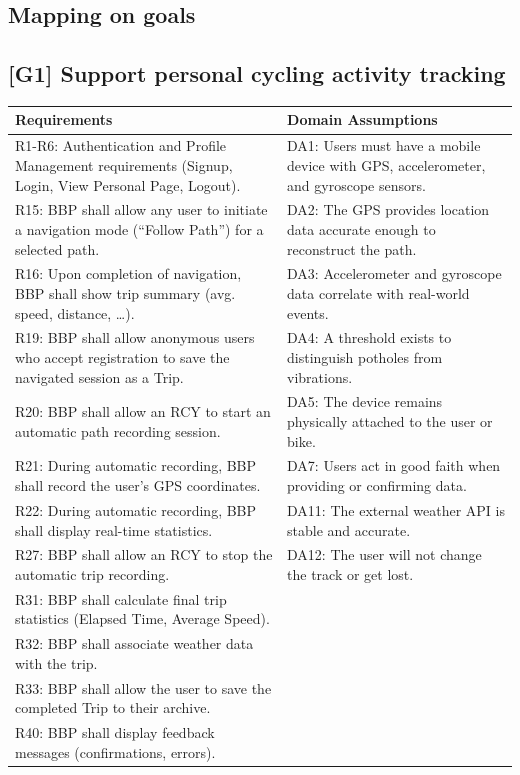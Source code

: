 \newpage



\newpage
\subsection{Mapping on goals}

\subsection*{[G1] Support personal cycling activity tracking}
\begin{longtable}{|L{0.47\textwidth}|L{0.47\textwidth}|}
\hline
\textbf{Requirements} & \textbf{Domain Assumptions} \\ \hline
R1-R6: Authentication and Profile Management requirements (Signup, Login, View Personal Page, Logout). & DA1: Users must have a mobile device with GPS, accelerometer, and gyroscope sensors. \\ \hline
R15: BBP shall allow any user to initiate a navigation mode (“Follow Path”) for a selected path. & DA2: The GPS provides location data accurate enough to reconstruct the path. \\ \hline
R16: Upon completion of navigation, BBP shall show trip summary (avg. speed, distance, …). & DA3: Accelerometer and gyroscope data correlate with real-world events. \\ \hline
R19: BBP shall allow anonymous users who accept registration to save the navigated session as a Trip. & DA4: A threshold exists to distinguish potholes from vibrations. \\ \hline
R20: BBP shall allow an RCY to start an automatic path recording session. & DA5: The device remains physically attached to the user or bike. \\ \hline
R21: During automatic recording, BBP shall record the user’s GPS coordinates. & DA7: Users act in good faith when providing or confirming data. \\ \hline
R22: During automatic recording, BBP shall display real-time statistics. & DA11: The external weather API is stable and accurate. \\ \hline
R27: BBP shall allow an RCY to stop the automatic trip recording. & DA12: The user will not change the track or get lost. \\ \hline
R31: BBP shall calculate final trip statistics (Elapsed Time, Average Speed). & \\ \hline
R32: BBP shall associate weather data with the trip. & \\ \hline
R33: BBP shall allow the user to save the completed Trip to their archive. & \\ \hline
R40: BBP shall display feedback messages (confirmations, errors). & \\ \hline
\end{longtable}

